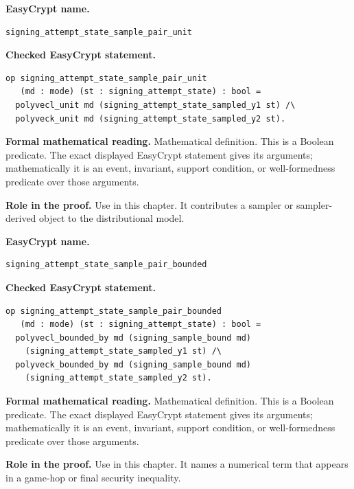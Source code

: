 \begin{formaldefinition}
\noindent\textbf{EasyCrypt name.}
\begin{lstlisting}[language=EasyCrypt,basicstyle=\ttfamily\scriptsize]
signing_attempt_state_sample_pair_unit
\end{lstlisting}
\noindent\textbf{Checked EasyCrypt statement.}
\begin{lstlisting}[language=EasyCrypt,basicstyle=\ttfamily\scriptsize]
op signing_attempt_state_sample_pair_unit
   (md : mode) (st : signing_attempt_state) : bool =
  polyvecl_unit md (signing_attempt_state_sampled_y1 st) /\
  polyveck_unit md (signing_attempt_state_sampled_y2 st).
\end{lstlisting}
\noindent\textbf{Formal mathematical reading.}
Mathematical definition. This is a Boolean predicate.  The exact displayed EasyCrypt statement gives its arguments; mathematically it is an event, invariant, support condition, or well-formedness predicate over those arguments.

\noindent\textbf{Role in the proof.}
Use in this chapter. It contributes a sampler or sampler-derived object to the distributional model.

\end{formaldefinition}

\begin{formaldefinition}
\noindent\textbf{EasyCrypt name.}
\begin{lstlisting}[language=EasyCrypt,basicstyle=\ttfamily\scriptsize]
signing_attempt_state_sample_pair_bounded
\end{lstlisting}
\noindent\textbf{Checked EasyCrypt statement.}
\begin{lstlisting}[language=EasyCrypt,basicstyle=\ttfamily\scriptsize]
op signing_attempt_state_sample_pair_bounded
   (md : mode) (st : signing_attempt_state) : bool =
  polyvecl_bounded_by md (signing_sample_bound md)
    (signing_attempt_state_sampled_y1 st) /\
  polyveck_bounded_by md (signing_sample_bound md)
    (signing_attempt_state_sampled_y2 st).
\end{lstlisting}
\noindent\textbf{Formal mathematical reading.}
Mathematical definition. This is a Boolean predicate.  The exact displayed EasyCrypt statement gives its arguments; mathematically it is an event, invariant, support condition, or well-formedness predicate over those arguments.

\noindent\textbf{Role in the proof.}
Use in this chapter. It names a numerical term that appears in a game-hop or final security inequality.

\end{formaldefinition}

